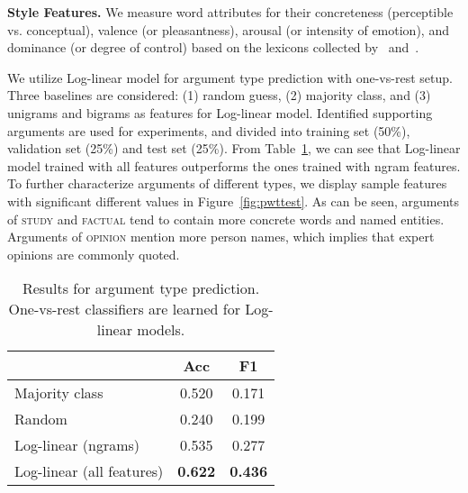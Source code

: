 \noindent \textbf{Style Features.} We measure word attributes for their concreteness (perceptible vs. conceptual), valence (or pleasantness), arousal (or intensity of emotion), and dominance (or degree of control) based on the lexicons collected by~ and~.%


We utilize Log-linear model for argument type prediction with one-vs-rest setup. Three baselines are considered: (1) random guess, (2) majority class, and (3) unigrams and bigrams as features for Log-linear model. 
Identified supporting arguments are used for experiments, and divided into training set (50\%), validation set (25\%) and test set (25\%). From Table~\ref{tab:typeresult}, we can see that Log-linear model trained with all features outperforms the ones trained with ngram features. 
To further characterize arguments of different types, we display sample features with significant different values in Figure~\ref{fig:pwttest}. As can be seen, arguments of \textsc{study} and \textsc{factual} tend to contain more concrete words and named entities. Arguments of \textsc{opinion} mention more person names, which implies that expert opinions are commonly quoted. 


\begin{table}[t]
    \centering
    \fontsize{10}{11}\selectfont
    \begin{tabular}{|l|c|c|}
    \hline
         & {\bf Acc} & {\bf F1}  \\
        \hline
        Majority class & 0.520 & 0.171 \\
        \hline
        Random & 0.240 & 0.199 \\
        \hline
        Log-linear (ngrams) & 0.535 & 0.277 \\
        \hline
        Log-linear (all features) & {\bf 0.622} & {\bf 0.436} \\
        \hline
    \end{tabular}
    \caption{\fontsize{10}{12}\selectfont Results for argument type prediction. One-vs-rest classifiers are learned for Log-linear models.}
    \label{tab:typeresult}
\end{table}

